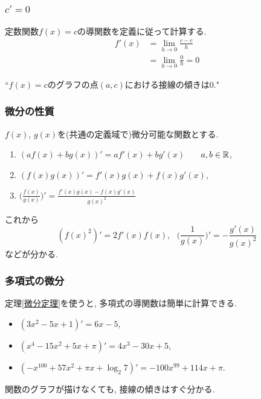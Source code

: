 

\begin{frame}
\frametitle{$c'=0$}

定数関数$f(x)=c$の導関数を定義に従って計算する. 
\begin{align*}
f'(x) & = \lim_{h\to 0} \frac{c-c}{h} \\
& = \lim_{h\to 0}\frac{0}{h}=0
\end{align*}

``$f(x)=c$のグラフの点$(a,c)$における接線の傾きは$0$." 

\end{frame}





\begin{frame}
\frametitle{微分の性質}

\begin{Thm} \label{微分定理}
$f(x)$, $g(x)$を(共通の定義域で)微分可能な関数とする. \vspace{1mm}
\begin{enumerate}
\item $(af(x)+bg(x))'=af'(x)+bg'(x)$ \ \ \ $a,b \in \mathbb{R}$, \vspace{1mm}
\item $(f(x)g(x))'=f'(x)g(x)+f(x)g'(x)$, \vspace{1mm}
\item $\Big(\frac{f(x)}{g(x)}\Big)'=\frac{f'(x)g(x)-f(x)g'(x)}{g(x)^2}$
\end{enumerate}
\end{Thm}
これから
$$
(f(x)^2)'=2f'(x)f(x), \ \ \ \Big(\frac{1}{g(x)}\Big)'=-\frac{g'(x)}{g(x)^2}
$$
などが分かる. 

\end{frame}






\begin{frame}
\frametitle{多項式の微分}

定理\ref{微分定理}を使うと, 多項式の導関数は簡単に計算できる.  

\begin{itemize}
\item $(3x^2-5x+1)'=6x-5$, 
\item $(x^4-15x^2+5x+\pi)'=4x^3-30x+5$, 
\item $(-x^{100}+57x^{2}+\pi x+ \log_2 7)'=-100x^{99}+114x+\pi$. 
\end{itemize}

関数のグラフが描けなくても, 接線の傾きはすぐ分かる. 

\end{frame}

